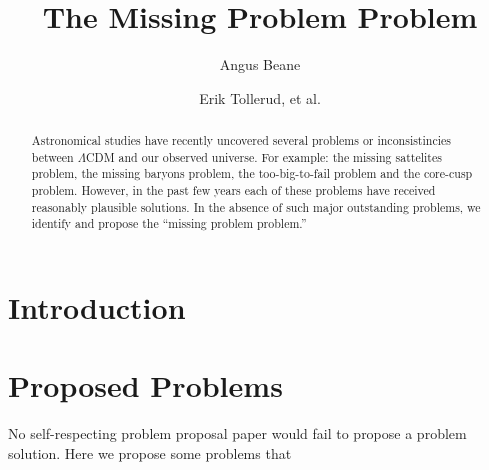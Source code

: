 \documentclass{aastex62}
\begin{document}
\title{The Missing Problem Problem}


\author{Angus Beane}

\author{Erik Tollerud, et al.}

\begin{abstract}

Astronomical studies have recently uncovered several problems or
inconsistincies between $\Lambda$CDM and our observed universe. For example:
the missing sattelites problem, the missing baryons problem, the
too-big-to-fail problem and the core-cusp problem. However, in the past few
years each of these problems have received reasonably plausible solutions. In
the absence of such major outstanding problems, we identify and propose the
``missing problem problem.''

\end{abstract}


\section{Introduction} \label{sec:intro}



\section{Proposed Problems} \label{sec:prop}
No self-respecting problem proposal paper would fail to propose a problem
solution. Here we propose some problems that 
\end{document}
